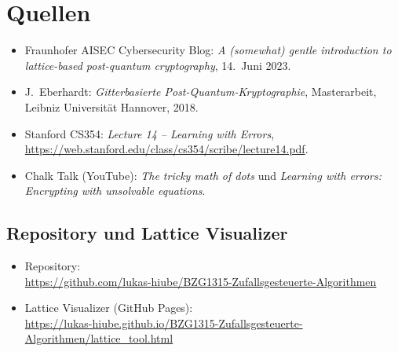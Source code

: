 \chapter*{Quellen}

\begin{itemize}
    \item Fraunhofer AISEC Cybersecurity Blog: \textit{A (somewhat) gentle introduction to lattice-based post-quantum cryptography}, 14.~Juni 2023.
    \item J.~Eberhardt: \textit{Gitterbasierte Post-Quantum-Kryptographie}, Masterarbeit, Leibniz Universität Hannover, 2018.
    \item Stanford CS354: \textit{Lecture 14 -- Learning with Errors}, \url{https://web.stanford.edu/class/cs354/scribe/lecture14.pdf}.
    \item Chalk Talk (YouTube): \textit{The tricky math of dots} und \textit{Learning with errors: Encrypting with unsolvable equations}.
\end{itemize}

\section*{Repository und Lattice Visualizer}

\begin{itemize}
    \item Repository:\\
    \url{https://github.com/lukas-hiube/BZG1315-Zufallsgesteuerte-Algorithmen}
    \item Lattice Visualizer (GitHub Pages):\\
    \url{https://lukas-hiube.github.io/BZG1315-Zufallsgesteuerte-Algorithmen/lattice_tool.html}
\end{itemize}
